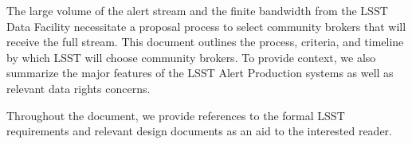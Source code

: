 The large volume of the alert stream and the finite bandwidth from the LSST Data Facility necessitate a proposal process to select community brokers that will receive the full stream.
This document outlines the process, criteria, and timeline by which LSST will choose community brokers.
To provide context, we also summarize the major features of the LSST Alert Production systems as well as relevant data rights concerns.

Throughout the document, we provide references to the formal LSST requirements and relevant design documents as an aid to the interested reader.
